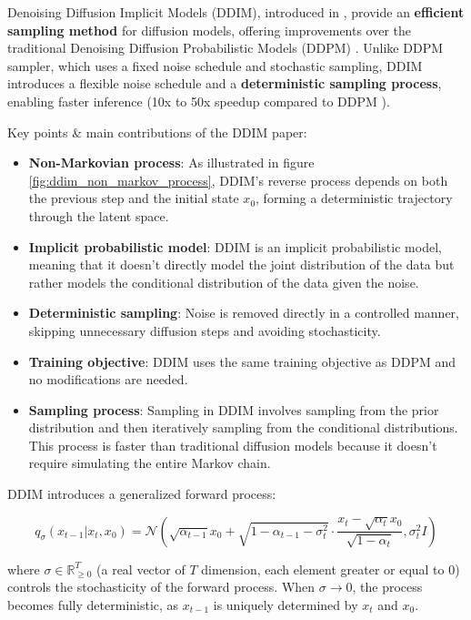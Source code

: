 Denoising Diffusion Implicit Models (DDIM), introduced in \cite{ddim}, provide an \textbf{efficient sampling method} for diffusion models, offering improvements over the traditional Denoising Diffusion Probabilistic Models (DDPM) \cite{ddpm}. Unlike DDPM sampler, which uses a fixed noise schedule and stochastic sampling, DDIM introduces a flexible noise schedule and a \textbf{deterministic sampling process}, enabling faster inference (10x to 50x speedup compared to DDPM \cite{ddim}).

Key points \& main contributions of the DDIM paper:

\begin{itemize}
    \item \textbf{Non-Markovian process}: As illustrated in figure \ref{fig:ddim_non_markov_process}, DDIM's reverse process depends on both the previous step and the initial state $x_0$, forming a deterministic trajectory through the latent space.
    \item \textbf{Implicit probabilistic model}: DDIM is an implicit probabilistic model, meaning that it doesn't directly model the joint distribution of the data but rather models the conditional distribution of the data given the noise.
    \item \textbf{Deterministic sampling}: Noise is removed directly in a controlled manner, skipping unnecessary diffusion steps and avoiding stochasticity.
    \item \textbf{Training objective}: DDIM uses the same training objective as DDPM and no modifications are needed.
    \item \textbf{Sampling process}: Sampling in DDIM involves sampling from the prior distribution and then iteratively sampling from the conditional distributions. This process is faster than traditional diffusion models because it doesn't require simulating the entire Markov chain.
\end{itemize}

DDIM introduces a generalized forward process:

\[
q_\sigma (x_{t-1} | x_t, x_0) = \mathcal{N} \left( \sqrt{\alpha_{t-1}} x_0 + \sqrt{1 - \alpha_{t-1} - \sigma_t^2} \cdot \frac{x_t - \sqrt{\alpha_t} x_0}{\sqrt{1 - \alpha_t}}, \sigma_t^2 I \right)
\]

where $\sigma \in \mathbb{R}^T_{\geq 0}$ (a real vector of $T$ dimension, each element greater or equal to 0) controls the stochasticity of the forward process. When $\sigma \rightarrow 0$, the process becomes fully deterministic, as $x_{t-1}$ is uniquely determined by $x_t$ and $x_0$.

